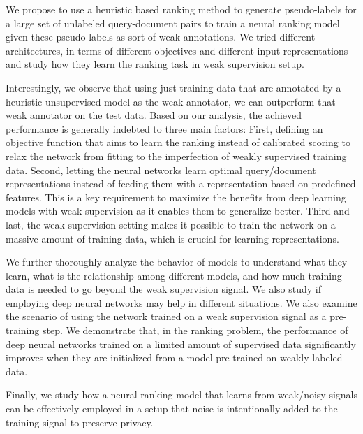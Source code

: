We propose to use a heuristic based ranking method to generate pseudo-labels for a large set of unlabeled query-document pairs to train a neural ranking model given these pseudo-labels as sort of weak annotations.  We tried different architectures, in terms of different objectives and different input representations and study how they learn the ranking task in weak supervision setup.

Interestingly, we observe that using just training data that are annotated by a heuristic unsupervised model as the weak annotator, we can outperform that weak annotator on the test data. Based on our analysis, the achieved performance is generally indebted to three main factors: 
%
First, defining an objective function that aims to learn the ranking instead of calibrated scoring to relax the network from fitting to the imperfection of weakly supervised training data.
%
Second, letting the neural networks learn optimal query/document representations instead of feeding them with a representation based on predefined features. This is a key requirement to maximize the benefits from deep learning models with weak supervision as it enables them to generalize better.
%
Third and last, the weak supervision setting makes it possible to train the network on a massive amount of training data, which is crucial for learning representations.
%

We further thoroughly analyze the behavior of models to understand what they learn, what is the relationship among different models, and how much training data is needed to go beyond the weak supervision signal. We also study if employing deep neural networks may help in different situations.
%
We also examine the scenario of using the network trained on a weak supervision signal as a pre-training step. We demonstrate that, in the ranking problem, the performance of deep neural networks trained on a limited amount of supervised data significantly improves when they are initialized from a model pre-trained on weakly labeled data.

Finally, we study how a neural ranking model that learns from weak/noisy signals can be effectively employed in a setup that noise is intentionally added to the training signal to preserve privacy.


